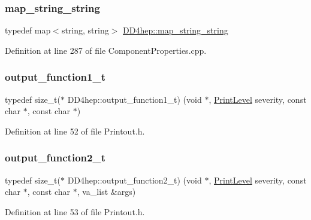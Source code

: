 \subsubsection{\texorpdfstring{map\+\_\+string\+\_\+string}{map\_string\_string}}
{\footnotesize\ttfamily typedef map$<$string, string$>$ \hyperlink{namespace_d_d4hep_a0f6ae5793bad82d7e3c5a6fd76334cf1}{D\+D4hep\+::map\+\_\+string\+\_\+string}}



Definition at line 287 of file Component\+Properties.\+cpp.

\hypertarget{namespace_d_d4hep_ae0b064bdf91daefc2e45293797f6780b}{}\label{namespace_d_d4hep_ae0b064bdf91daefc2e45293797f6780b} 
\subsubsection{\texorpdfstring{output\+\_\+function1\+\_\+t}{output\_function1\_t}}
{\footnotesize\ttfamily typedef size\+\_\+t($\ast$ D\+D4hep\+::output\+\_\+function1\+\_\+t) (void $\ast$, \hyperlink{namespace_d_d4hep_a5b5a64d56252469451f2020a27d57d42}{Print\+Level} severity, const char $\ast$, const char $\ast$)}



Definition at line 52 of file Printout.\+h.

\hypertarget{namespace_d_d4hep_a932f25438e2e68169d1a82ff99301873}{}\label{namespace_d_d4hep_a932f25438e2e68169d1a82ff99301873} 
\subsubsection{\texorpdfstring{output\+\_\+function2\+\_\+t}{output\_function2\_t}}
{\footnotesize\ttfamily typedef size\+\_\+t($\ast$ D\+D4hep\+::output\+\_\+function2\+\_\+t) (void $\ast$, \hyperlink{namespace_d_d4hep_a5b5a64d56252469451f2020a27d57d42}{Print\+Level} severity, const char $\ast$, const char $\ast$, va\+\_\+list \&args)}



Definition at line 53 of file Printout.\+h.

\hypertarget{namespace_d_d4hep_ae77e9f3818be8d649b030c537e235efe}{}\label{namespace_d_d4hep_ae77e9f3818be8d649b030c537e235efe} 
